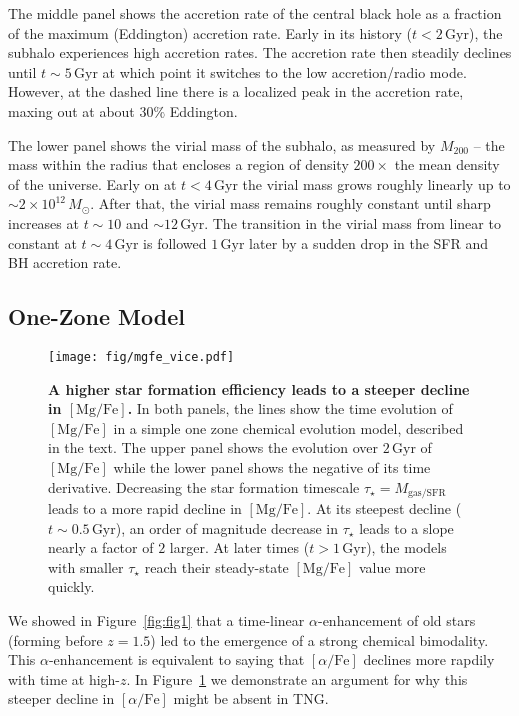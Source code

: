 \documentclass[linenumbers, twocolumn]{aastex631}
\newcommand{\Msun}{\ensuremath{M_{\odot}}}
\newcommand{\Gyr}{\ensuremath{\textrm{Gyr}}}
\newcommand{\MgFe}{\ensuremath{[\textrm{Mg}/\textrm{Fe}]}}
\newcommand{\alphaFe}{\ensuremath{[\alpha/\textrm{Fe}]}}
\begin{document}
The middle panel shows the accretion rate of the central black hole as a fraction of the maximum (Eddington) accretion rate. Early in its history ($t<2\,\Gyr$), the subhalo experiences high accretion rates. The accretion rate then steadily declines until $t\sim5\,\Gyr$ at which point it switches to the low accretion/radio mode. However, at the dashed line there is a localized peak in the accretion rate, maxing out at about $30\%$ Eddington.

The lower panel shows the virial mass of the subhalo, as measured by $M_{200}$ -- the mass within the radius that encloses a region of density $200\times$ the mean density of the universe. Early on at $t<4\,\Gyr$ the virial mass grows roughly linearly up to $\sim2\times10^{12}\,\Msun$. After that, the virial mass remains roughly constant until sharp increases at $t\sim10$ and $\sim12\,\Gyr$. The transition in the virial mass from linear to constant at $t\sim4\,\Gyr$ is followed $1\,\Gyr$ later by a sudden drop in the SFR and BH accretion rate.

\subsection{One-Zone Model}\label{ssec:onezone}

\begin{figure}
  \centering
  \texttt{[image: fig/mgfe\_vice.pdf]}
  \caption{\textbf{A higher star formation efficiency leads to a steeper decline in \MgFe{}.} In both panels, the lines show the time evolution of \MgFe{} in a simple one zone chemical evolution model, described in the text. The upper panel shows the evolution over $2\,\Gyr$ of \MgFe{} while the lower panel shows the negative of its time derivative. Decreasing the star formation timescale $\tau_{\star}=M_{\textrm{gas}/\textrm{SFR}}$ leads to a more rapid decline in \MgFe{}. At its steepest decline ($t\sim0.5\,\Gyr$), an order of magnitude decrease in $\tau_{\star}$ leads to a slope nearly a factor of $2$ larger. At later times ($t>1\,\Gyr$), the models with smaller $\tau_{\star}$ reach their steady-state \MgFe{} value more quickly.}
  \label{fig:vice}
\end{figure}

We showed in Figure~\ref{fig:fig1} that a time-linear $\alpha$-enhancement of old stars (forming before $z=1.5$) led to the emergence of a strong chemical bimodality. This $\alpha$-enhancement is equivalent to saying that \alphaFe{} declines more rapdily with time at high-$z$. In Figure~\ref{fig:vice} we demonstrate an argument for why this steeper decline in \alphaFe{} might be absent in TNG.
\end{document}
